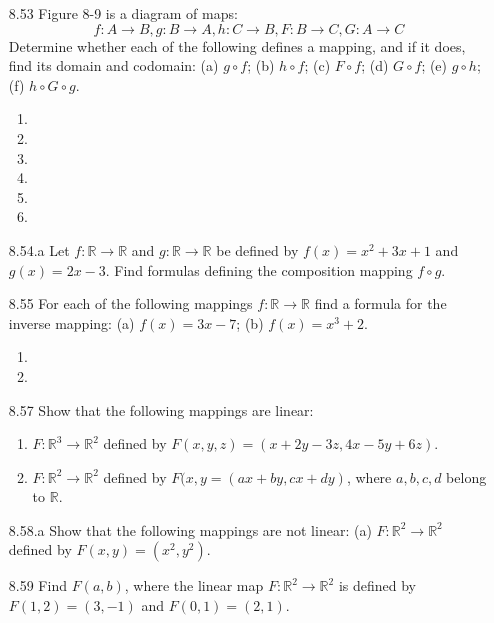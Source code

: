 \documentclass[12pt]{article}
\theoremstyle{definition}
\theoremstyle{plain}
\begin{document}
\begin{enumerate}
\item[8.53] Figure 8-9 is a diagram of maps:
\[ f: A\rightarrow B, g: B \rightarrow A, h: C \rightarrow B, F: B\rightarrow C, G:A\rightarrow C \]
Determine whether each of the following defines a mapping, and if it does, find its domain and codomain: (a) $g \circ f$; (b) $h \circ f$; (c) $F \circ f$; (d) $G \circ f$; (e) $g \circ h$; (f) $h \circ G \circ g$.
	\begin{enumerate}
	\item
	\item
	\item
	\item
	\item
	\item
	\end{enumerate}
\item[8.54.a] Let $f: \mathbb{R} \rightarrow \mathbb{R}$ and $g: \mathbb{R} \rightarrow \mathbb{R}$ be defined by $f(x)=x^2+3x+1$ and $g(x)=2x-3$. Find formulas defining the composition mapping $f \circ g$.
\item[8.55] For each of the following mappings $f: \mathbb{R} \rightarrow \mathbb{R}$ find a formula for the inverse mapping: (a) $f(x)=3x-7$; (b) $f(x)=x^3+2$.
	\begin{enumerate}
	\item
	\item
	\end{enumerate}
\item[8.57] Show that the following mappings are linear:
	\begin{enumerate}
	\item $F: \mathbb{R}^3\rightarrow\mathbb{R}^2$ defined by $F(x,y,z)=(x+2y-3z,4x-5y+6z)$.
	\item $F:\mathbb{R}^2\rightarrow\mathbb{R}^2$ defined by $F(x,y=(ax+by,cx+dy)$, where $a,b,c,d$ belong to $\mathbb{R}$.
	\end{enumerate}
\item[8.58.a] Show that the following mappings are not linear: (a) $F:\mathbb{R}^2\rightarrow\mathbb{R}^2$ defined by $F(x,y)=(x^2,y^2)$.
\item[8.59] Find $F(a,b)$, where the linear map $F:\mathbb{R}^2 \rightarrow \mathbb{R}^2$ is defined by $F(1,2)=(3,-1)$ and $F(0,1)=(2,1)$.




\end{enumerate}
\end{document}
